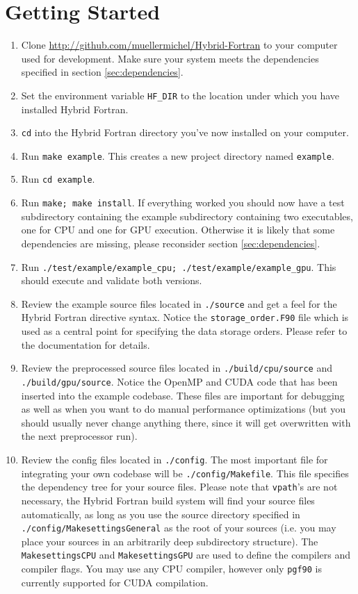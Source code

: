 \section{Getting Started}
\begin{enumerate}
 \item Clone \url{http://github.com/muellermichel/Hybrid-Fortran} to your computer used for development. Make sure your system meets the dependencies specified in section \ref{sec:dependencies}.
 \item Set the environment variable \verb|HF_DIR| to the location under which you have installed Hybrid Fortran.
 \item \verb|cd| into the Hybrid Fortran directory you've now installed on your computer.
 \item Run \verb|make example|. This creates a new project directory named \verb|example|.
 \item Run \verb|cd example|.
 \item Run \verb|make; make install|. If everything worked you should now have a test subdirectory containing the example subdirectory containing two executables, one for CPU and one for GPU execution. Otherwise it is likely that some dependencies are missing, please reconsider section \ref{sec:dependencies}.
 \item Run \verb|./test/example/example_cpu; ./test/example/example_gpu|. This should execute and validate both versions.
 \item Review the example source files located in \verb|./source| and get a feel for the Hybrid Fortran directive syntax. Notice the \verb|storage_order.F90| file which is used as a central point for specifying the data storage orders. Please refer to the documentation for details.
 \item Review the preprocessed source files located in \verb|./build/cpu/source| and \verb|./build/gpu/source|. Notice the OpenMP and CUDA code that has been inserted into the example codebase. These files are important for debugging as well as when you want to do manual performance optimizations (but you should usually never change anything there, since it will get overwritten with the next preprocessor run).
 \item Review the config files located in \verb|./config|. The most important file for integrating your own codebase will be \verb|./config/Makefile|. This file specifies the dependency tree for your source files. Please note that \verb|vpath|'s are not necessary, the Hybrid Fortran build system will find your source files automatically, as long as you use the source directory specified in \verb|./config/MakesettingsGeneral| as the root of your sources (i.e. you may place your sources in an arbitrarily deep subdirectory structure). The \verb|MakesettingsCPU| and \verb|MakesettingsGPU| are used to define the compilers and compiler flags. You may use any CPU compiler, however only \verb|pgf90| is currently supported for CUDA compilation.

\end{enumerate}
